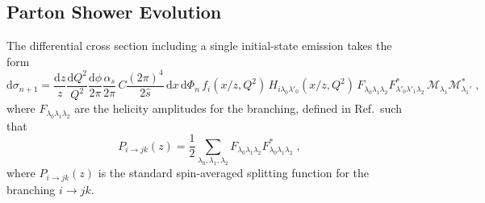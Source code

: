 \documentclass[a4paper,11pt]{article}
\begin{document}
\subsection{Parton Shower Evolution}

The differential cross section including a single initial-state emission takes the form
\begin{equation}
 \mathrm{d}\sigma_{n+1} = \frac{\mathrm{d}z}z \frac{\mathrm{d}Q^2}{Q^2} \frac{\mathrm{d}\phi}{2\pi}\frac{\alpha_s}{2\pi}\,
 C \frac{(2\pi)^4}{2\hat{s}}\, \mathrm{d}x\, \mathrm{d}\Phi_n\,
 f_i\left(x/z,Q^2\right)\, H_{i\lambda_0\lambda'_0}\left(x/z,Q^2\right)\,
 F_{\lambda_0\lambda_1\lambda_2} F^*_{\lambda'_0\lambda'_1\lambda_2}\,
 \mathcal{M}_{\lambda_1}\mathcal{M}^*_{\lambda_1'}\;,
\end{equation}
where $F_{\lambda_0\lambda_1\lambda_2}$ are the helicity amplitudes for the branching, defined in Ref.\,\cite{Richardson:2018pvo} such that
\begin{equation}
  P_{i\to jk}(z) = \frac12\sum_{\lambda_0,\lambda_1,\lambda_2}  F_{\lambda_0\lambda_1\lambda_2} F^*_{\lambda_0\lambda_1\lambda_2}\;,
\end{equation}
where $P_{i\to jk}(z)$ is the standard spin-averaged splitting function for the branching $i\to jk$.
\end{document}

